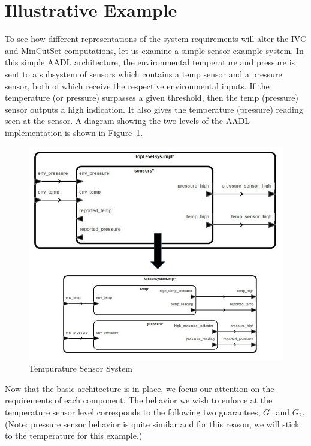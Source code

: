 \section{Illustrative Example}
 To see how different representations of the system requirements will alter the IVC and MinCutSet computations, let us examine a simple sensor example system. In this simple AADL architecture, the environmental temperature and pressure is sent to a subsystem of sensors which contains a temp sensor and a pressure sensor, both of which receive the respective environmental inputs. If the temperature (or pressure) surpasses a given threshold, then the temp (pressure) sensor outputs a high indication. It also gives the temperature (pressure) reading seen at the sensor. A diagram showing the two levels of the AADL implementation is shown in Figure~\ref{fig:sensorGran1}.  

\begin{figure}[h]
\begin{center}
\includegraphics[width=14cm]{images/sensorGran.png}
\caption{Tempurature Sensor System} 
\label{fig:sensorGran1}
\end{center}
\end{figure}

Now that the basic architecture is in place, we focus our attention on the requirements of each component. The behavior we wish to enforce at the temperature sensor level corresponds to the following two guarantees, $G_1$ and $G_2$. (Note: pressure sensor behavior is quite similar and for this reason, we will stick to the temperature for this example.) 

